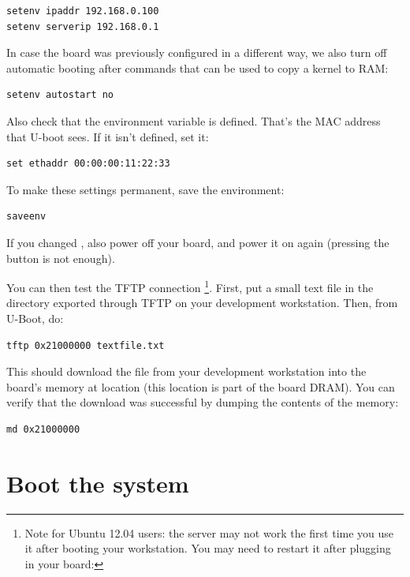 \begin{verbatim}
setenv ipaddr 192.168.0.100
setenv serverip 192.168.0.1
\end{verbatim}

In case the board was previously configured in a different way, we
also turn off automatic booting after commands that can be used to
copy a kernel to RAM:

\begin{verbatim}
setenv autostart no
\end{verbatim}

Also check that the  environment variable is
defined. That's the MAC address that U-boot sees. If it isn't defined,
set it:

\begin{verbatim}
set ethaddr 00:00:00:11:22:33
\end{verbatim}

To make these settings permanent, save the environment:

\begin{verbatim}
saveenv
\end{verbatim}

If you changed , also power off your board, and power it
on again (pressing the  button is not enough).

You can then test the TFTP connection
\footnote{Note for Ubuntu 12.04 users: the 
server may not work the first time you use it after booting your 
workstation. You may need to restart it after plugging in your board: 
}.
First, put a small text file in
the directory exported through TFTP on your development
workstation. Then, from U-Boot, do:

\begin{verbatim}
tftp 0x21000000 textfile.txt
\end{verbatim}

This should download the file  from your development
workstation into the board's memory at location  (this
location is part of the board DRAM). You can verify that the download
was successful by dumping the contents of the memory:

\begin{verbatim}
md 0x21000000
\end{verbatim}

\section{Boot the system}

